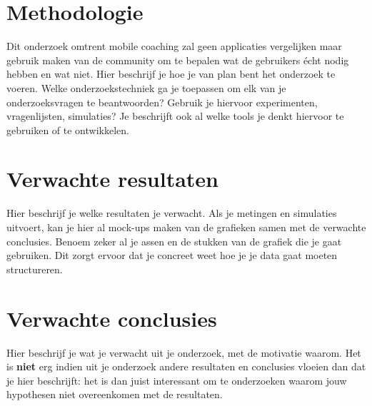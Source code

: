 


\section{Methodologie}
\label{sec:methodologie}

Dit onderzoek omtrent mobile coaching zal geen applicaties vergelijken maar gebruik maken van de community om te bepalen wat de gebruikers écht nodig hebben en wat niet. \break
\break
Hier beschrijf je hoe je van plan bent het onderzoek te voeren. Welke onderzoekstechniek ga je toepassen om elk van je onderzoeksvragen te beantwoorden? Gebruik je hiervoor experimenten, vragenlijsten, simulaties? Je beschrijft ook al welke tools je denkt hiervoor te gebruiken of te ontwikkelen.

\section{Verwachte resultaten}
\label{sec:verwachte_resultaten}

Hier beschrijf je welke resultaten je verwacht. Als je metingen en simulaties uitvoert, kan je hier al mock-ups maken van de grafieken samen met de verwachte conclusies. Benoem zeker al je assen en de stukken van de grafiek die je gaat gebruiken. Dit zorgt ervoor dat je concreet weet hoe je je data gaat moeten structureren.

\section{Verwachte conclusies}
\label{sec:verwachte_conclusies}

Hier beschrijf je wat je verwacht uit je onderzoek, met de motivatie waarom. Het is \textbf{niet} erg indien uit je onderzoek andere resultaten en conclusies vloeien dan dat je hier beschrijft: het is dan juist interessant om te onderzoeken waarom jouw hypothesen niet overeenkomen met de resultaten.

